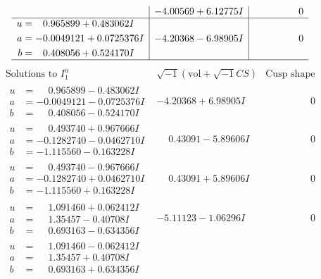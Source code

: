 \documentclass[1p]{elsarticle_modified}
\theoremstyle{definition}
\newcommand{\I}{\sqrt{-1}}
\begin{document}
$$\begin{array}{c|c|c}
 & -4.00569 + 6.12775 I & \phantom{-0.000000 } 0 \\ \hline\begin{aligned}
u &= \phantom{-}0.965899 + 0.483062 I \\
a &= -0.0049121 + 0.0725376 I \\
b &= \phantom{-}0.408056 + 0.524170 I\end{aligned}
 & -4.20368 - 6.98905 I & \phantom{-0.000000 } 0\\
 \hline 
 \end{array}$$\newpage$$\begin{array}{c|c|c}  
\text{Solutions to }I^u_{1}& \I (\text{vol} + \sqrt{-1}CS) & \text{Cusp shape}\\
 \hline 
\begin{aligned}
u &= \phantom{-}0.965899 - 0.483062 I \\
a &= -0.0049121 - 0.0725376 I \\
b &= \phantom{-}0.408056 - 0.524170 I\end{aligned}
 & -4.20368 + 6.98905 I & \phantom{-0.000000 } 0 \\ \hline\begin{aligned}
u &= \phantom{-}0.493740 + 0.967666 I \\
a &= -0.1282740 - 0.0462710 I \\
b &= -1.115560 - 0.163228 I\end{aligned}
 & \phantom{-}0.43091 - 5.89606 I & \phantom{-0.000000 } 0 \\ \hline\begin{aligned}
u &= \phantom{-}0.493740 - 0.967666 I \\
a &= -0.1282740 + 0.0462710 I \\
b &= -1.115560 + 0.163228 I\end{aligned}
 & \phantom{-}0.43091 + 5.89606 I & \phantom{-0.000000 } 0 \\ \hline\begin{aligned}
u &= \phantom{-}1.091460 + 0.062412 I \\
a &= \phantom{-}1.35457 - 0.40708 I \\
b &= \phantom{-}0.693163 - 0.634356 I\end{aligned}
 & -5.11123 - 1.06296 I & \phantom{-0.000000 } 0 \\ \hline\begin{aligned}
u &= \phantom{-}1.091460 - 0.062412 I \\
a &= \phantom{-}1.35457 + 0.40708 I \\
b &= \phantom{-}0.693163 + 0.634356 I\end{aligned}

\end{array}$$
\end{document}
